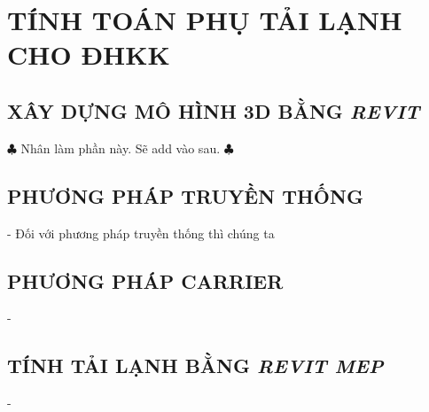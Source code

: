 \newpage
{}

\newpage
\chapter{\textbf{TÍNH TOÁN PHỤ TẢI LẠNH CHO ĐHKK}}
\newpage

\section{XÂY DỰNG MÔ HÌNH 3D BẰNG \emph{REVIT}}
\hspace{1cm}$ \clubsuit $ Nhân làm phần này. Sẽ add vào sau. $ \clubsuit $

\section{PHƯƠNG PHÁP TRUYỀN THỐNG}
\hspace{1cm}- Đối với phương pháp truyền thống thì chúng ta 

\section{PHƯƠNG PHÁP CARRIER}
\hspace{1cm}- 

\section{TÍNH TẢI LẠNH BẰNG \emph{REVIT MEP}}
\hspace{1cm}- 


